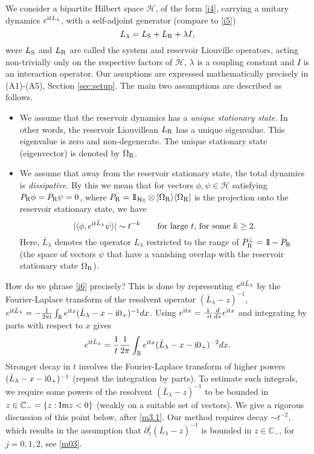 \documentclass[letterpaper,onecolumn,11pt,accepted=2021-12-09]{quantumarticle}
\numberwithin{equation}{section}
\renewcommand{\r}{{\rm R}}
\newcommand{\s}{{\rm S}}
\renewcommand{\i}{{\rm i}}
\newcommand{\bbbone}{\mathchoice {\rm 1\mskip-4mu l} {\rm 1\mskip-4mu l}
	{\rm 1\mskip-4.5mu l} {\rm 1\mskip-5mu l}}
\begin{document}
We consider a bipartite Hilbert space $\mathcal H$, of the form \eqref{i4}, carrying a unitary dynamics $e^{\i t L_\lambda}$, with a self-adjoint generator (compare to \eqref{i5})
$$
L_\lambda=L_\s+L_\r+\lambda I,
$$
were $L_\s$ and $L_\r$ are called the system and reservoir Liouville operators, acting non-trivially only on the respective factors of $\mathcal H$, $\lambda$ is a coupling constant and $I$ is an interaction operator. Our assuptions are expressed mathematically precisely in (A1)-(A5), Section \ref{sec:setup}. The main two assumptions are described as follows. 
\begin{itemize}
	\item We assume that the reservoir dynamics has a {\em unique stationary state}. In other words, the reservoir Liouvillean $L_\r$ has a unique eigenvalue. This eigenvalue is zero and non-degen\-erate. The unique stationary state (eigenvector) is denoted by $\Omega_\r$. 
	
	\item We assume that away from the reservoir stationary state, the total dynamics is {\em dissipative}. By this we mean that for vectors $\phi,\psi\in\mathcal H$ satisfying $P_\r\phi=P_\r\psi=0$, where $P_\r =\bbbone_{{\mathcal H}_\s}\otimes |\Omega_\r\rangle\langle\Omega_\r|$ is the projection onto the reservoir stationary state, we have
	\begin{equation}
	\label{i6}
	|\langle\phi, e^{\i t \bar L_\lambda}\psi\rangle|\sim t^{-k}\mbox{\qquad  for large $t$, for some $k\ge 2$.}
	\end{equation}
	Here, $\bar L_\lambda$ denotes the operator $L_\lambda$ restricted to the range of $P_\r^\perp=\bbbone-P_\r$ (the space of vectors $\psi$ that have a vanishing overlap with the reservoir stationary state $\Omega_\r$).
\end{itemize}
How do we phrase \eqref{i6} precisely? This is done  by representing $e^{\i t \bar L_\lambda}$ by the Fourier-Laplace transform of the resolvent operator $(\bar L_\lambda-z)^{-1}$,
$e^{\i t \bar L_\lambda}= -\tfrac{1}{2\pi\i}\int_{\mathbb R} e^{\i t x}(\bar L_\lambda-x-\i 0_+)^{-1} dx$.  Using $e^{\i t x}=  \frac{1}{\ i t}\tfrac{d}{dx} e^{\i t x}$ and integrating by parts with respect to $x$ gives 
$$
e^{\i t \bar L_\lambda} = \frac 1t \frac{1}{2\pi }\int_{\mathbb R} e^{\i t x}(\bar L_\lambda-x-\i 0_+)^{-2}dx.
$$ 
Stronger decay in $t$ involves the Fourier-Laplace transform of higher powers $(\bar L_\lambda-x-\i 0_+)^{-1}$ (repeat the integration by parts).  To estimate such integrals, we require some powers of the resolvent $(\bar L_\lambda-z)^{-1}$ to be bounded in $z\in{\mathbb C}_-=\{z: {\rm Im}z<0\}$ (weakly on a suitable set of vectors). We give a rigorous discussion of this point below, after \eqref{m3.1}. Our method requires decay $\sim t^{-2}$, which results in the assumption that $\partial^j_z (\bar L_\lambda-z)^{-1}$ is bounded in $z\in {\mathbb C}_-$, for $j=0,1,2$, see \eqref{m03}.
\smallskip
\end{document}
